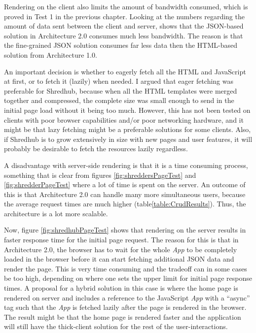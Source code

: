 Rendering on the client also limits the amount of bandwidth consumed, which is proved in Test 1 in the previous chapter. Looking at the numbers regarding the amount of data sent between the client and server, shows that the JSON-based solution in Architecture 2.0 consumes much less bandwidth. The reason is that the fine-grained JSON solution consumes far less data then the HTML-based solution from Architecture 1.0.

An important decision is whether to eagerly fetch all the HTML and JavaScript at first, or to fetch it (lazily) when needed. I argued that eager fetching was preferable for Shredhub, because when all the HTML templates were merged together and compressed, the complete size was small enough to send in the initial page load without it being too much. However, this has not been tested on clients with poor browser capabilities and/or poor networking hardware, and it might be that lazy fetching might be a preferable solutions for some clients. Also, if Shredhub is to grow extensively in size with new pages and user features, it will probably be desirable to fetch the resources lazily regardless.
 
A disadvantage with server-side rendering is that it is a time consuming process, something that is clear from figures \vref{fig:shreddersPageTest} and \vref{fig:shredderPageTest} where a lot of time is spent on the server. An outcome of this is that Architecture 2.0 can handle many more simultaneous users, because the average request times are much higher (table\vref{table:CrudResults}). Thus, the architecture is a lot more scalable.  

Now, figure \vref{fig:shredhubPageTest} shows that rendering on the server results in faster response time for the initial page request. The reason for this is that in Architecture 2.0, the browser has to wait for the whole \textit{App} to be completely loaded in the browser before it can start fetching additional JSON data and render the page. This is very time consuming and the tradeoff can in some cases be too high, depending on where one sets the upper limit for initial page response times. A proposal for a hybrid solution in this case is where the home page is rendered on server and includes a reference to the JavaScript \textit{App} with a ``async'' tag such that the \textit{App} is fetched lazily after the page is rendered in the browser. The result might be that the home page is rendered faster and the application will still have the thick-client solution for the rest of the user-interactions.  

